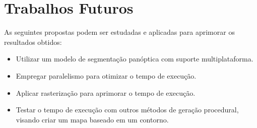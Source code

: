 \section{Trabalhos Futuros}

As seguintes propostas podem ser estudadas e aplicadas para aprimorar os resultados obtidos:

\begin{itemize}
    \item Utilizar um modelo de segmentação panóptica com suporte multiplataforma.
    \item Empregar paralelismo para otimizar o tempo de execução.
    \item Aplicar rasterização para aprimorar o tempo de execução.
    \item Testar o tempo de execução com outros métodos de geração procedural, visando criar um mapa baseado em um contorno.
\end{itemize}

